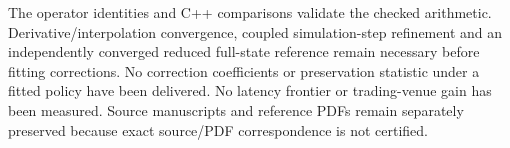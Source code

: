 The operator identities and C++ comparisons validate the checked arithmetic. Derivative/interpolation convergence, coupled simulation-step refinement and an independently converged reduced full-state reference remain necessary before fitting corrections. No correction coefficients or preservation statistic under a fitted policy have been delivered. No latency frontier or trading-venue gain has been measured. Source manuscripts and reference PDFs remain separately preserved because exact source/PDF correspondence is not certified.

